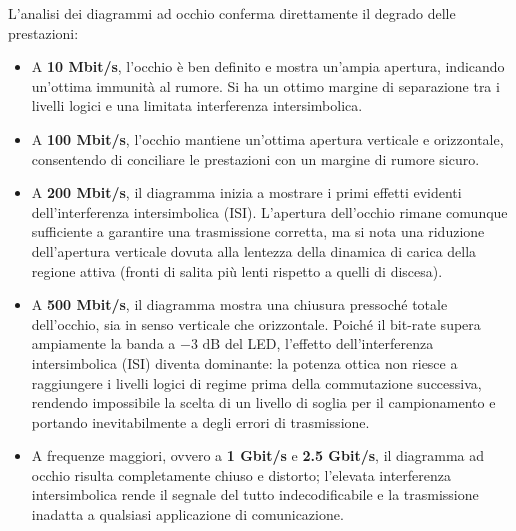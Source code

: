 \noindent L'analisi dei diagrammi ad occhio conferma direttamente il degrado delle prestazioni:
\begin{itemize}
    \item A \textbf{10 Mbit/s}, l'occhio è ben definito e mostra un'ampia apertura, indicando un'ottima immunità al rumore. Si ha un ottimo margine di separazione tra i livelli logici e una limitata interferenza intersimbolica.
    \item A \textbf{100 Mbit/s}, l'occhio mantiene un'ottima apertura verticale e orizzontale, consentendo di conciliare le prestazioni con un margine di rumore sicuro.
    \item A \textbf{200 Mbit/s}, il diagramma inizia a mostrare i primi effetti evidenti dell'interferenza intersimbolica (ISI). L'apertura dell'occhio rimane comunque
    sufficiente a garantire una trasmissione corretta, ma si nota una riduzione dell'apertura verticale dovuta alla lentezza della dinamica di carica della regione attiva
    (fronti di salita più lenti rispetto a quelli di discesa).
    \item A \textbf{500 Mbit/s}, il diagramma mostra una chiusura pressoché totale dell'occhio, sia in senso verticale che orizzontale. Poiché il bit-rate
    supera ampiamente la banda a $-3\text{ dB}$ del LED, l'effetto dell'interferenza intersimbolica (ISI) diventa dominante: la potenza ottica non riesce a raggiungere
    i livelli logici di regime prima della commutazione successiva, rendendo impossibile la scelta di un livello di soglia per il campionamento e portando inevitabilmente a 
    degli errori di trasmissione.
    \item A frequenze maggiori, ovvero a \textbf{1 Gbit/s} e \textbf{2.5 Gbit/s}, il diagramma ad occhio risulta completamente chiuso e distorto; l'elevata interferenza
    intersimbolica rende il segnale del tutto indecodificabile e la trasmissione inadatta a qualsiasi applicazione di comunicazione.
\end{itemize}